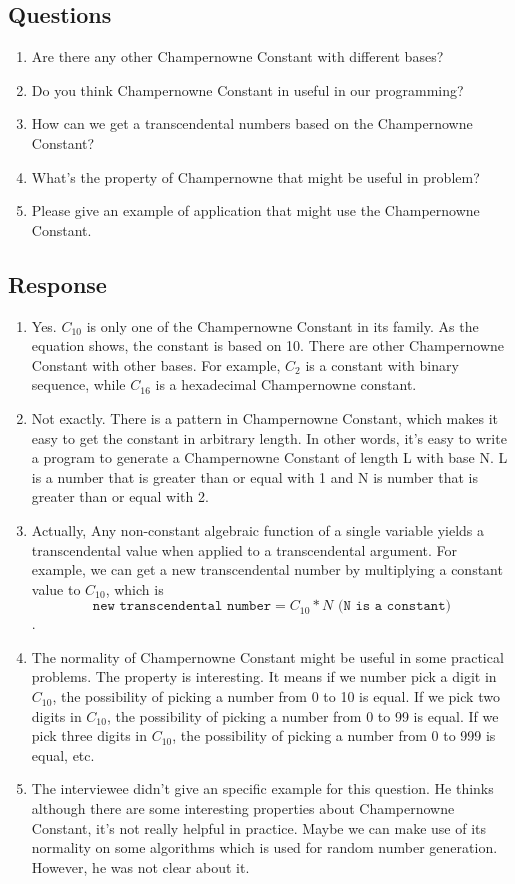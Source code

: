 \documentclass[10pt]{article}
\begin{document}
\subsection{Questions}
\begin{enumerate}
    \item Are there any other Champernowne Constant with different bases?
    \item Do you think Champernowne Constant in useful in our programming?
    \item How can we get a transcendental numbers based on the Champernowne Constant?
    \item What's the property of Champernowne that might be useful in problem? 
    \item Please give an example of application that might use the Champernowne Constant.
\end{enumerate}
\subsection{Response}
\begin{enumerate}
    \item Yes. $C_{10}$ is only one of the Champernowne Constant in its family. As the equation shows, the constant is based on 10. There are other Champernowne Constant with other bases. For example, $C_{2}$ is a constant with binary sequence, while $C_16$ is a hexadecimal Champernowne constant.
    \item Not exactly. There is a pattern in Champernowne Constant, which makes it easy to get the constant in arbitrary length. In other words, it's easy to write a program to generate a Champernowne Constant of length L with base N. L is a number that is greater than or equal with 1 and N is number that is greater than or equal with 2.
    \item Actually, Any non-constant algebraic function of a single variable yields a transcendental value when applied to a transcendental argument. For example, we can get a new transcendental number by multiplying a constant value to $C_{10}$, which is $$\texttt{new transcendental number} = C_{10} * N \texttt { (N is a constant)}$$.
    \item The normality of Champernowne Constant might be useful in some practical problems. The property is interesting. It means if we number pick a digit in $C_{10}$, the possibility of picking a number from 0 to 10 is equal. If we pick two digits in $C_{10}$, the possibility of picking a number from 0 to 99 is equal. If we pick three digits in $C_{10}$, the possibility of picking a number from 0 to 999 is equal, etc.
    \item The interviewee didn't give an specific example for this question. He thinks although there are some interesting properties about Champernowne Constant, it's not really helpful in practice. Maybe we can make use of its normality on some algorithms which is used for random number generation. However, he was not clear about it.
\end{enumerate}
\end{document}
